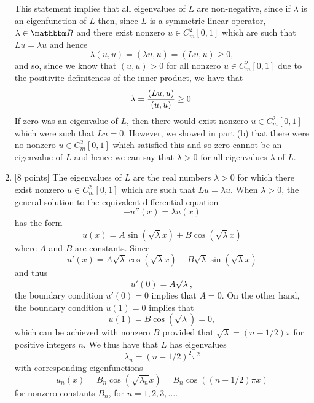 \begin{solution}
\begin{enumerate}
          This statement implies that all eigenvalues of $L$ are non-negative, since if $\lambda$ is an eigenfunction of $L$ then, since $L$ is a symmetric linear operator, $\lambda\in\R$ and there exist nonzero $u\in C_m^2[0,1]$ which are such that $Lu=\lambda u$ and hence
           \[ \lambda (u, u) = (\lambda u, u) = (L u, u) \ge 0,\]
          and so, since we know that $(u,u)>0$ for all nonzero $u\in C_m^2[0,1]$ due to the positivite-definiteness
          of the inner product, we have that
\[
\lambda = {(L u, u) \over (u, u)}\ge 0.
\]
If zero was an eigenvalue of $L$, then there would exist nonzero $u\in C_m^2[0,1]$ which were such that $Lu=0$. However, we showed in part (b) that there were no nonzero $u\in C_m^2[0,1]$ which satisfied this and so zero cannot be an eigenvalue of $L$ and hence we can say that $\lambda > 0$ for all eigenvalues $\lambda$ of $L$.
\\
\item  {[8 points]} The eigenvalues of $L$ are the real numbers $\lambda>0$ for which there exist nonzero $u\in C_m^2[0,1]$ which are such that $L u = \lambda u$.  When $\lambda>0$, the general solution to the equivalent
        differential equation
                   \[  -u'' (x) = \lambda u(x)\]
        has the form
                   \[ u(x) = A \sin(\sqrt{\lambda} x) + B \cos(\sqrt{\lambda}x)\]
        where $A$ and $B$ are constants. Since
                    \[ u'(x) = A\sqrt{\lambda} \cos(\sqrt{\lambda}x)
                               - B \sqrt{\lambda} \sin(\sqrt{\lambda}x)\]
        and thus
                    \[ u'(0) = A \sqrt{\lambda},\]
        the boundary condition $u'(0) = 0$ implies that $A=0$.
        On the other hand, the boundary condition $u(1) = 0$ implies that
                    \[ u(1) = B \cos(\sqrt{\lambda}) = 0,\]
        which can be achieved with nonzero $B$ provided that 
        $\sqrt{\lambda} = (n-1/2)\pi$ for positive integers $n$.
        We thus have that $L$ has eigenvalues
                    \[ \lambda_n = (n-1/2)^2 \pi^2\]
        with corresponding eigenfunctions
                    \[ u_n(x) = B_n\cos(\sqrt{\lambda_n} x) = B_n\cos((n-1/2)\pi x)\]
for nonzero constants $B_n$, for $n=1,2,3,\ldots$.
\end{enumerate}
\end{solution}